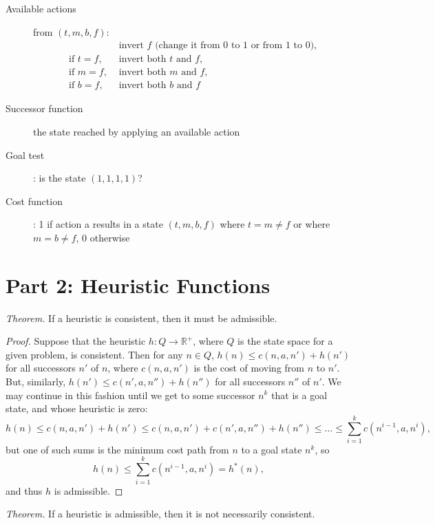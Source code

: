 \documentclass[11pt]{amsart}
\begin{document}
\begin{enumerate}
\begin{description}
\item[Available actions] from $(t, m, b, f)$:
\begin{align*}
	&\text{ invert $f$ (change it from 0 to 1 or from 1 to 0),} \\
	\text{if } t = f, &\text{ invert both $t$ and $f$,} \\
	\text{if } m = f, &\text{ invert both $m$ and $f$,} \\
	\text{if } b = f, &\text{ invert both $b$ and $f$}
\end{align*}

\item[Successor function] the state reached by applying an available action

\item[Goal test]: is the state $(1, 1, 1, 1)$?

\item[Cost function]: 1 if action a results in a state $(t, m, b, f)$ where $t
= m \neq f$ or where $m = b \neq f$, 0 otherwise
\end{description}

\end{enumerate}

\section*{Part 2: Heuristic Functions}

\emph{Theorem.}
If a heuristic is consistent, then it must be admissible.

\begin{proof}
Suppose that the heuristic $h: Q \rightarrow \mathbb{R}^+$, where $Q$ is the state space for a given
problem, is consistent.  Then for any $n \in Q$, $h(n) \leq c(n, a, n') + h(n')$ for all successors
$n'$ of $n$, where $c(n, a, n')$ is the cost of moving from $n$ to $n'$.  But, similarly, $h(n') \leq
c(n', a, n'') + h(n'')$ for all successors $n''$ of $n'$.  We may continue in this fashion until we
get to some successor $n^k$ that is a goal state, and whose heuristic is zero:
\[
h(n) \leq c(n, a, n') + h(n') \leq c(n, a, n') + c(n', a, n'') + h(n'') \leq \dots \leq
\sum_{i = 1}^k c(n^{i-1}, a, n^i),
\]
but one of such sums is the minimum cost path from $n$ to a goal state $n^k$, so
\[
h(n) \leq \sum_{i = 1}^k c(n^{i-1}, a, n^i) = h^*(n),
\]
and thus $h$ is admissible.
\end{proof}

\emph{Theorem.}
If a heuristic is admissible, then it is not necessarily consistent.
\end{document}
